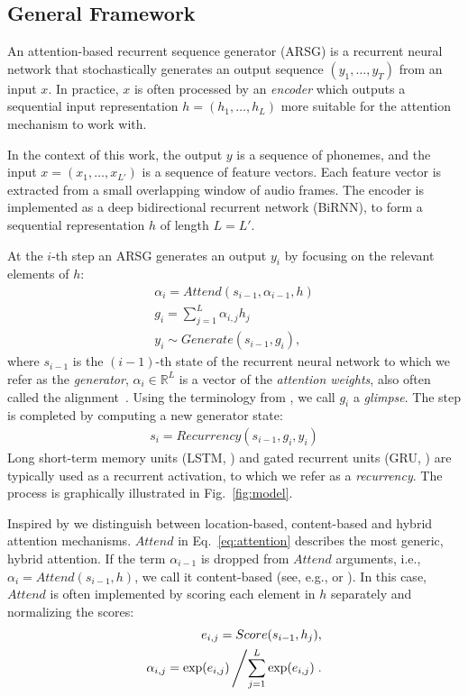 \documentclass{article} %
\begin{document}
\subsection{General Framework}
\label{subsec:framework}

An attention-based recurrent sequence generator (ARSG) is a recurrent neural
network that stochastically generates an output sequence $(y_1, \dots, y_T)$
from an input $x$.  In practice, $x$ is often processed by an {\it encoder}
which outputs a sequential input representation $h=(h_1,\ldots,h_L)$ more
suitable for the attention mechanism to work with.

In the context of this work, the output $y$ is a sequence of phonemes, and the
input $x=(x_1, \ldots, x_{L'})$ is a sequence of feature vectors. Each feature
vector is extracted from a small overlapping window of audio frames. The encoder
is implemented as a deep bidirectional recurrent network (BiRNN), to form a
sequential representation $h$ of length $L=L'$.

At the $i$-th step an ARSG generates an output $y_i$ by focusing on the relevant
elements of $h$:
\begin{align}
    \alpha_i = Attend(s_{i-1},\alpha_{i-1},h) 
    \label{eq:attention}
    \\
    g_i = \sum\limits_{j=1}^L \alpha_{i,j} h_j 
    \label{eq:glimpse}
    \\
    y_i \sim Generate(s_{i-1}, g_i),
    \label{eq:generate}
\end{align}
where $s_{i-1}$ is the $(i-1)$-th state of the recurrent neural network to which
we refer as the {\it generator}, $\alpha_i \in \mathbb{R}^L$ is a vector of the
{\it attention weights}, also often called the
alignment~\cite{bahdanau_neural_2014}. Using the terminology from
\cite{mnih_2014}, we call $g_i$ a {\it glimpse}. The step is completed by
computing a new generator state:
\begin{align}
s_i = Recurrency(s_{i-1}, g_i, y_i)
\label{eq:recurrency}
\end{align}
Long short-term memory units (LSTM, \cite{hochreiter_1997}) and gated recurrent
units (GRU, \cite{cho_2014}) are typically used as a recurrent activation, to
which we refer as a {\it recurrency}.  The process is graphically illustrated in
Fig.~\ref{fig:model}.

Inspired by \cite{graves_2014}  we distinguish between location-based,
content-based and hybrid attention mechanisms. $Attend$ in
Eq.~\eqref{eq:attention} describes the most generic, hybrid attention. If the
term $\alpha_{i-1}$ is dropped from $Attend$ arguments, i.e.,
$\alpha_i=Attend(s_{i-1},h)$,
we call it content-based (see, e.g., \cite{bahdanau_neural_2014} or
\cite{xu_show_2015}). In this case, $Attend$ is often implemented by scoring
each element in $h$ separately and normalizing the scores:
\begin{align}
  \label{eq:pure_cb_attention}
    e_{i,j}=Score(s_{i-1}, h_j), \\ 
  \label{eq:softmax_normalization}
    \alpha_{i,j} = 
        \exp(e_{i,j}) \left/
        \sum\limits_{j=1}^L \exp(e_{i,j}) \right..
\end{align}    
\end{document}
